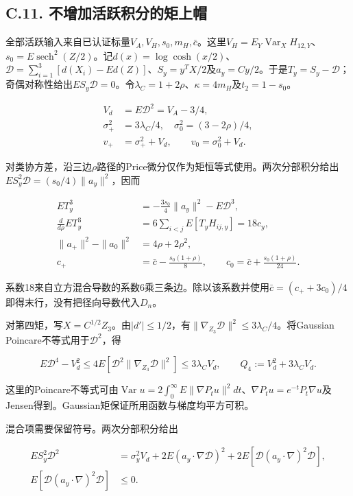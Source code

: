 \documentclass[11pt,a4paper]{article}
\begin{document}
\subsection*{C.11.
不增加活跃积分的矩上帽}\label{c.11.-ux4e0dux589eux52a0ux6d3bux8dc3ux79efux5206ux7684ux77e9ux4e0aux5e3d}

全部活跃输入来自已认证标量\(V_A,V_H,s_0,m_H,\bar c\)。这里\(V_H=E_Y\operatorname{Var}_XH_{12,Y}\)、\(s_0=E\operatorname{sech}^2(Z/2)\)。记\(d(x)=\log\cosh(x/2)\)、\(\mathcal D=\sum_{i=1}^3[d(X_i)-Ed(Z)]\)、\(S_y=y^TX/2\)及\(a_y=Cy/2\)。于是\(T_y=S_y-\mathcal D\)；奇偶对称性给出\(ES_y\mathcal D=0\)。令\(\lambda_C=1+2\rho\)、\(\kappa=4m_H\)及\(t_2=1-s_0\)。

\[
\begin{aligned}
V_d&=E\mathcal D^2=V_A-3/4,\\
\sigma_+^2&=3\lambda_C/4,\quad \sigma_0^2=(3-2\rho)/4,\\
v_+&=\sigma_+^2+V_d,\qquad v_0=\sigma_0^2+V_d.
\end{aligned}
\tag{C.49}
\]

对类协方差，沿三边\(\rho\)路径的Price微分仅作为矩恒等式使用。两次分部积分给出\(ES_y^2\mathcal D=(s_0/4)\|a_y\|^2\)，因而

\[
\begin{aligned}
ET_y^3&=-\tfrac{3s_0}4\|a_y\|^2-E\mathcal D^3,\\
\frac d{d\rho}ET_y^3&=6\sum_{i<j}E[T_yH_{ij,y}]=18c_y,\\
\|a_+\|^2-\|a_0\|^2&=4\rho+2\rho^2,\\
c_+&=\bar c-\frac{s_0(1+\rho)}8,\qquad
c_0=\bar c+\frac{s_0(1+\rho)}{24}.
\end{aligned}
\tag{C.50}
\]

系数18来自立方混合导数的系数6乘三条边。除以该系数并使用\(\bar c=(c_++3c_0)/4\)即得末行，没有把径向导数代入\(D_n\)。

对第四矩，写\(X=C^{1/2}Z_3\)。由\(|d'|\le1/2\)，有\(\|\nabla_{Z_3}\mathcal D\|^2\le3\lambda_C/4\)。将Gaussian
Poincare不等式用于\(\mathcal D^2\)，得

\[
E\mathcal D^4-V_d^2\le4E[\mathcal D^2\|\nabla_{Z_3}\mathcal D\|^2]
\le3\lambda_CV_d,\qquad Q_4:=V_d^2+3\lambda_CV_d.
\tag{C.51}
\]

这里的Poincare不等式可由\(\operatorname{Var}u=2\int_0^\infty E\|\nabla P_tu\|^2dt\)、\(\nabla P_tu=e^{-t}P_t\nabla u\)及Jensen得到。Gaussian矩保证所用函数与梯度均平方可积。

混合项需要保留符号。两次分部积分给出

\[
\begin{aligned}
ES_y^2\mathcal D^2
&=\sigma_y^2V_d+2E(a_y\cdot\nabla\mathcal D)^2
+2E[\mathcal D(a_y\cdot\nabla)^2\mathcal D],\\
E[\mathcal D(a_y\cdot\nabla)^2\mathcal D]&\le0.
\end{aligned}
\tag{C.52}
\]
\end{document}
